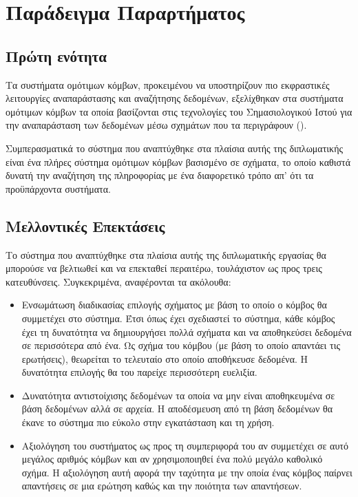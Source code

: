 \chapter{Παράδειγμα  Παραρτήματος}

\section{Πρώτη ενότητα}
Τα συστήματα ομότιμων κόμβων, προκειμένου να υποστηρίζουν πιο
εκφραστικές λειτουργίες αναπαράστασης και αναζήτησης δεδομένων,
εξελίχθηκαν στα συστήματα ομότιμων κόμβων τα οποία βασίζονται στις
τεχνολογίες του Σημασιολογικού Ιστού για την αναπαράσταση των
δεδομένων μέσω σχημάτων που τα περιγράφουν ().

Συμπερασματικά το σύστημα που αναπτύχθηκε στα πλαίσια αυτής της
διπλωματικής είναι ένα πλήρες σύστημα ομότιμων κόμβων βασισμένο σε
σχήματα, το οποίο καθιστά δυνατή την αναζήτηση της πληροφορίας με
ένα διαφορετικό τρόπο απ' ότι τα προϋπάρχοντα  συστήματα.

\section{Μελλοντικές Επεκτάσεις}
Το σύστημα που αναπτύχθηκε στα πλαίσια αυτής της διπλωματικής
εργασίας θα μπορούσε να βελτιωθεί και να επεκταθεί περαιτέρω,
τουλάχιστον ως προς τρεις κατευθύνσεις. Συγκεκριμένα, αναφέρονται
τα ακόλουθα:

\begin{itemize}
\item Ενσωμάτωση διαδικασίας επιλογής σχήματος με βάση το οποίο ο
κόμβος θα συμμετέχει στο σύστημα. Έτσι όπως έχει σχεδιαστεί το
σύστημα, κάθε κόμβος έχει τη δυνατότητα να δημιουργήσει πολλά
σχήματα και να αποθηκεύσει δεδομένα σε περισσότερα από ένα. Ως
σχήμα του κόμβου (με βάση το οποίο απαντάει τις ερωτήσεις),
θεωρείται το τελευταίο στο οποίο αποθήκευσε δεδομένα. Η δυνατότητα
επιλογής θα του παρείχε περισσότερη ευελιξία.
\item Δυνατότητα αντιστοίχισης δεδομένων τα οποία να μην είναι
αποθηκευμένα σε βάση δεδομένων αλλά σε αρχεία. Η αποδέσμευση από
τη βάση δεδομένων θα έκανε το σύστημα πιο εύκολο στην εγκατάσταση
και τη χρήση.
\item Αξιολόγηση του συστήματος ως προς τη συμπεριφορά του αν
συμμετέχει σε αυτό μεγάλος αριθμός κόμβων  και αν χρησιμοποιηθεί ένα πολύ μεγάλο καθολικό σχήμα. H
αξιολόγηση αυτή αφορά την ταχύτητα με την οποία ένας κόμβος
παίρνει απαντήσεις σε μια ερώτηση καθώς και την ποιότητα των
απαντήσεων.
\end{itemize}


